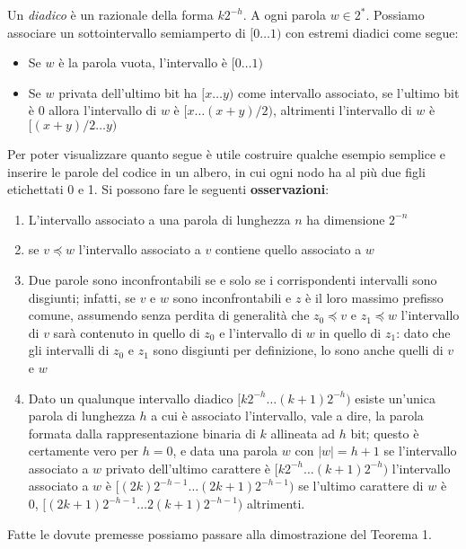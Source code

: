 Un \textit{diadico} è un razionale della forma $k2^{-h}$. A ogni parola $w \in 2^*$. Possiamo associare un sottointervallo semiamperto di $[0\dots1)$ con estremi diadici come segue:
\begin{itemize}
	\item Se $w$ è la parola vuota, l'intervallo è $[0\dots1)$
	\item Se $w$ privata dell'ultimo bit ha $[x \dots y)$ come intervallo associato, se l'ultimo bit è 0 allora l'intervallo di $w$ è $[x \dots (x + y)/2)$, altrimenti l'intervallo di $w$ è $[(x + y)/2 \dots y)$
\end{itemize}
Per poter visualizzare quanto segue è utile costruire qualche esempio semplice e inserire le parole del codice in un albero, in cui ogni nodo ha al più due figli etichettati 0 e 1. Si possono fare le seguenti \textbf{osservazioni}:
\begin{enumerate}
	\item L'intervallo associato a una parola di lunghezza $n$ ha dimensione $2^{-n}$
	\item se $v \preceq w$ l'intervallo associato a $v$ contiene quello associato a $w$
	\item Due parole sono inconfrontabili se e solo se i corrispondenti intervalli sono disgiunti; infatti, se $v$ e $w$ sono inconfrontabili e $z$ è il loro massimo prefisso comune, assumendo senza perdita di generalità che $z_0 \preceq v$ e $z_1 \preceq w$ l'intervallo di $v$ sarà contenuto in quello di $z_0$ e l'intervallo di $w$ in quello di $z_1$: dato che gli intervalli di $z_0$ e $z_1$ sono disgiunti per definizione, lo sono anche quelli di $v$ e $w$
	\item Dato un qualunque intervallo diadico $[k2^{-h} \dots (k + 1)2^{-h})$ esiste un'unica parola di lunghezza $h$ a cui è associato l'intervallo, vale a dire, la parola formata dalla rappresentazione binaria di $k$ allineata ad $h$ bit; questo è certamente vero per $h = 0$, e data una parola $w$ con $|w| = h + 1$ se l'intervallo associato a $w$ privato dell'ultimo carattere è $[k2^{-h} \dots (k + 1)2^{-h})$ l'intervallo associato a $w$ è $[(2k)2^{-h-1} \dots (2k + 1)2^{-h-1})$ se l'ultimo carattere di $w$ è 0, $[(2k + 1)2^{-h-1} \dots 2(k + 1)2^{-h-1})$ altrimenti.
\end{enumerate}
Fatte le dovute premesse possiamo passare alla dimostrazione del Teorema 1.
